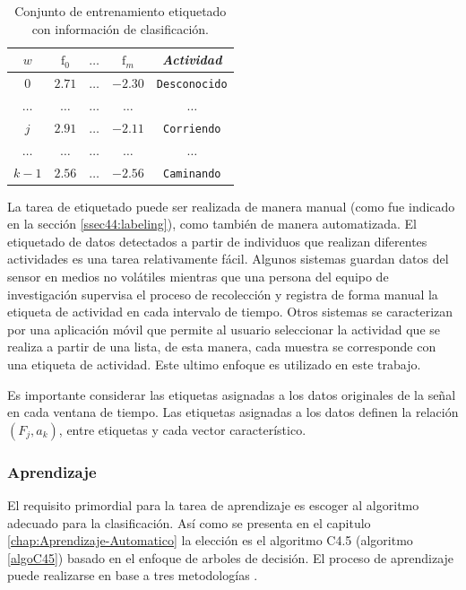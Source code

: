\begin{table}[!tbph]
\begin{centering}
\begin{tabular}{|c|c|c|c|c|}
\hline 
$w$ & $\mathrm{f}_{0}$ & $\ldots$ & $\mathrm{f}_{m}$ & \emph{Actividad}\tabularnewline
\hline 
\hline 
$0$ & $2.71$ & \texttt{$\ldots$} & \texttt{$-2.30$} & \texttt{\small{}Desconocido}\tabularnewline
\hline 
$\ldots$ & $\ldots$ & \texttt{$\ldots$} & \texttt{$\ldots$} & \texttt{$\ldots$}\tabularnewline
\hline 
$j$ & $2.91$ & \texttt{$\ldots$} & \texttt{$-2.11$} & \texttt{\small{}Corriendo}\tabularnewline
\hline 
$\ldots$ & $\ldots$ & \texttt{$\ldots$} & \texttt{$\ldots$} & \texttt{$\ldots$}\tabularnewline
\hline 
$k-1$ & $2.56$ & \texttt{$\ldots$} & \texttt{$-2.56$} & \texttt{\small{}Caminando}\tabularnewline
\hline 
\end{tabular}
\par\end{centering}
\caption[Instancias etiquetadas]{\label{tab4:labeled}Conjunto de entrenamiento etiquetado con información
de clasificación.}
\end{table}

La tarea de etiquetado puede ser realizada de manera manual (como
fue indicado en la sección \ref{ssec44:labeling}), como también de
manera automatizada. El etiquetado de datos detectados a partir de
individuos que realizan diferentes actividades es una tarea relativamente
fácil. Algunos sistemas guardan datos del sensor en medios no volátiles
mientras que una persona del equipo de investigación supervisa el
proceso de recolección y registra de forma manual la etiqueta de actividad
en cada intervalo de tiempo. Otros sistemas se caracterizan por una
aplicación móvil que permite al usuario seleccionar la actividad que
se realiza a partir de una lista, de esta manera, cada muestra se
corresponde con una etiqueta de actividad. Este ultimo enfoque es
utilizado en este trabajo.

Es importante considerar las etiquetas asignadas a los datos originales
de la señal en cada ventana de tiempo. Las etiquetas asignadas a los
datos definen la relación $(F_{j},a_{k})$, entre etiquetas y cada
vector característico. 

\subsubsection{Aprendizaje}

El requisito primordial para la tarea de aprendizaje es escoger al
algoritmo adecuado para la clasificación. Así como se presenta en
el capitulo \ref{chap:Aprendizaje-Automatico} la elección es el algoritmo
C4.5 (algoritmo \ref{algoC45}) basado en el enfoque de arboles de
decisión. El proceso de aprendizaje puede realizarse en base a tres
metodologías \cite{Rajaraman2011}.

